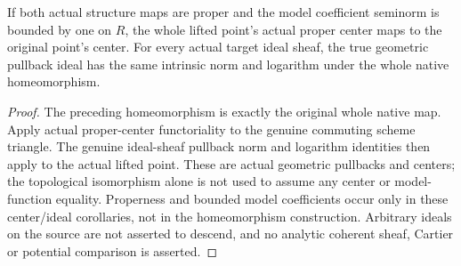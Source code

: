 \begin{theorem}
\label{scheme:proper-base-open-modification-model-functions}
\leanok
{}
If both actual structure maps are proper and the model coefficient
seminorm is bounded by one on $R$, the whole lifted point's actual
proper center maps to the original point's center. For every actual
target ideal sheaf, the true geometric pullback ideal has the same
intrinsic norm and logarithm under the whole native homeomorphism.
\end{theorem}
\begin{proof}
The preceding homeomorphism is exactly the original whole native map.
Apply actual proper-center functoriality to the genuine commuting
scheme triangle. The genuine ideal-sheaf pullback norm and logarithm
identities then apply to the actual lifted point. These are actual
geometric pullbacks and centers; the topological isomorphism alone
is not used to assume any center or model-function equality. Properness
and bounded model coefficients occur only in these center/ideal
corollaries, not in the homeomorphism construction. Arbitrary ideals
on the source are not asserted to descend, and no analytic coherent
sheaf, Cartier or potential comparison is asserted.
\end{proof}
